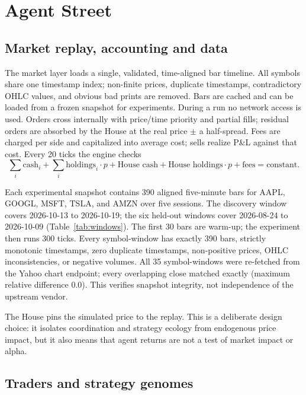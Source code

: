 \documentclass[11pt]{article}
\begin{document}
\section{Agent Street}

\subsection{Market replay, accounting and data}

The market layer loads a single, validated, time-aligned bar timeline. All
symbols share one timestamp index; non-finite prices, duplicate timestamps,
contradictory OHLC values, and obvious bad prints are removed. Bars are cached
and can be loaded from a frozen snapshot for experiments. During a run no network
access is used. Orders cross internally with price/time priority and partial
fills; residual orders are absorbed by the House at the real price $\pm$ a
half-spread. Fees are charged per side and capitalized into average cost; sells
realize P\&L against that cost. Every 20 ticks the engine checks
\begin{equation}
  \sum_i \text{cash}_i + \sum_i \text{holdings}_i\cdot p
  + \text{House cash} + \text{House holdings}\cdot p + \text{fees}
  = \text{constant}.
  \label{eq:invariant}
\end{equation}

Each experimental snapshot contains 390 aligned five-minute bars for AAPL, GOOGL,
MSFT, TSLA, and AMZN over five sessions. The discovery window covers 2026-10-13
to 2026-10-19; the six held-out windows cover 2026-08-24 to 2026-10-09
(Table~\ref{tab:windows}). The first 30 bars are warm-up; the experiment then
runs 300 ticks. Every symbol-window has exactly 390 bars, strictly monotonic
timestamps, zero duplicate timestamps, non-positive prices, OHLC
inconsistencies, or negative volumes. All 35 symbol-windows were re-fetched from
the Yahoo chart endpoint; every overlapping close matched exactly (maximum
relative difference $0.0$). This verifies snapshot integrity, not independence of
the upstream vendor.

The House pins the simulated price to the replay. This is a deliberate design
choice: it isolates coordination and strategy ecology from endogenous price
impact, but it also means that agent returns are not a test of market impact or
alpha.

\subsection{Traders and strategy genomes}
\end{document}
